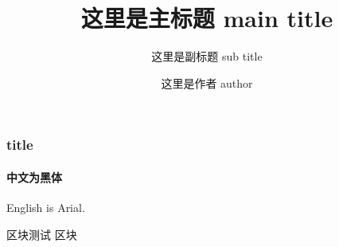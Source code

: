 \documentclass[12pt, aspectratio=169]{beamer}
\title{这里是主标题 main title}
\subtitle{这里是副标题 sub title}
\author{这里是作者 author}
\institute{这里是学院 institute}
\begin{document}
\begin{frame}
    \titlepage
\end{frame}

\begin{frame}
    \frametitle{title}
    \framesubtitle{中文为黑体}

    English is Arial.

    \begin{block}{区块测试}
        区块
    \end{block}

\end{frame}
\end{document}

